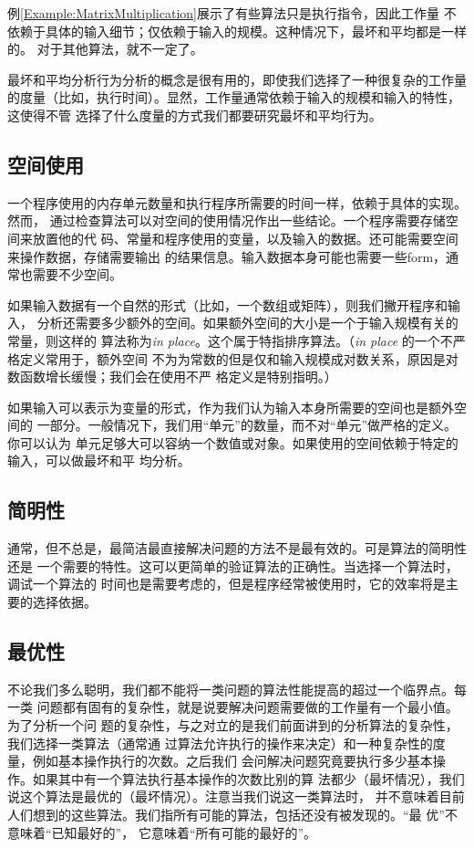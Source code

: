 例\ref{Example:MatrixMultiplication}展示了有些算法只是执行指令，因此工作量
不依赖于具体的输入细节；仅依赖于输入的规模。这种情况下，最坏和平均都是一样的。
对于其他算法，就不一定了。

最坏和平均分析行为分析的概念是很有用的，即使我们选择了一种很复杂的工作量
的度量（比如，执行时间）。显然，工作量通常依赖于输入的规模和输入的特性，这使得不管
选择了什么度量的方式我们都要研究最坏和平均行为。


\subsection{空间使用}
一个程序使用的内存单元数量和执行程序所需要的时间一样，依赖于具体的实现。然而，
通过检查算法可以对空间的使用情况作出一些结论。一个程序需要存储空间来放置他的代
码、常量和程序使用的变量，以及输入的数据。还可能需要空间来操作数据，存储需要输出
的结果信息。输入数据本身可能也需要一些form，通常也需要不少空间。

如果输入数据有一个自然的形式（比如，一个数组或矩阵），则我们撇开程序和输入，
分析还需要多少额外的空间。如果额外空间的大小是一个于输入规模有关的常量，则这样的
算法称为\emph{in place}。这个属于特指排序算法。（\emph{in place}
的一个不严格定义常用于，额外空间
不为为常数的但是仅和输入规模成对数关系，原因是对数函数增长缓慢；我们会在使用不严
格定义是特别指明。）

如果输入可以表示为变量的形式，作为我们认为输入本身所需要的空间也是额外空间的
一部分。一般情况下，我们用“单元”的数量，而不对“单元”做严格的定义。你可以认为
单元足够大可以容纳一个数值或对象。如果使用的空间依赖于特定的输入，可以做最坏和平
均分析。

\subsection{简明性}
通常，但不总是，最简洁最直接解决问题的方法不是最有效的。可是算法的简明性还是
一个需要的特性。这可以更简单的验证算法的正确性。当选择一个算法时，调试一个算法的
时间也是需要考虑的，但是程序经常被使用时，它的效率将是主要的选择依据。

\subsection{最优性}
不论我们多么聪明，我们都不能将一类问题的算法性能提高的超过一个临界点。每一类
问题都有固有的复杂性，就是说要解决问题需要做的工作量有一个最小值。为了分析一个问
题的复杂性，与之对立的是我们前面讲到的分析算法的复杂性，我们选择一类算法（通常通
过算法允许执行的操作来决定）和一种复杂性的度量，例如基本操作执行的次数。之后我们
会问解决问题究竟要执行多少基本操作。如果其中有一个算法执行基本操作的次数比别的算
法都少（最坏情况），我们说这个算法是最优的（最坏情况）。注意当我们说这一类算法时，
并不意味着目前人们想到的这些算法。我们指所有可能的算法，包括还没有被发现的。“最
优”不意味着“已知最好的”， 它意味着“所有可能的最好的”。

